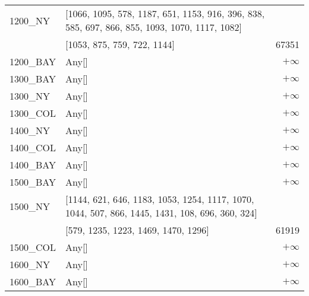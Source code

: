 \documentclass[main.tex]{subfiles}
\begin{document}
\begin{center}
\begin{tabular}{llr}
1200\_NY & [1066, 1095, 578, 1187, 651, 1153, 916, 396, 838, 585, 697, 866, 855, 1093, 1070, 1117, 1082]\\ & [1053, 875, 759, 722, 1144] & 67351\\
1200\_BAY & Any[] & $+\infty$\\
1300\_BAY & Any[] & $+\infty$\\
1300\_NY & Any[] & $+\infty$\\
1300\_COL & Any[] & $+\infty$\\
1400\_NY & Any[] & $+\infty$\\
1400\_COL & Any[] & $+\infty$\\
1400\_BAY & Any[] & $+\infty$\\
1500\_BAY & Any[] & $+\infty$\\
1500\_NY & [1144, 621, 646, 1183, 1053, 1254, 1117, 1070, 1044, 507, 866, 1445, 1431, 108, 696, 360, 324]\\ & [579, 1235, 1223, 1469, 1470, 1296] & 61919\\
1500\_COL & Any[] & $+\infty$\\
1600\_NY & Any[] & $+\infty$\\
1600\_BAY & Any[] & $+\infty$\\
\hline\end{tabular}
\end{center}
\newpage
\end{document}
